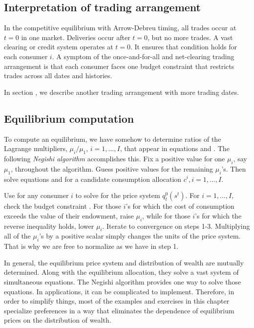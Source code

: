 \subsection{Interpretation of trading arrangement}
  In the  competitive   equilibrium with Arrow-Debreu timing, all trades occur at $t=0$ in
one market.  Deliveries occur after $t=0$, but no more trades.
  A vast clearing or credit system operates at $t=0$.
It ensures that condition  holds for each consumer
$i$.   A symptom of the once-and-for-all and net-clearing trading arrangement is
that each consumer faces one  budget constraint that restricts  trades across all dates and histories.


  In section , we describe another trading arrangement with
more trading dates. %


\subsection{Equilibrium computation}
To compute an equilibrium, we have somehow to determine ratios of
the Lagrange multipliers, $\mu_i / \mu_1$, $i=1, \ldots, I $,
that appear in equations  and .  The following {\it
Negishi algorithm\/} accomplishes this.
\medskip
{}  Fix a positive value for one $\mu_i$, say $\mu_1$,
throughout the algorithm.  Guess  positive values for the
remaining  $\mu_i$'s. Then solve  equations  and  for
a candidate consumption allocation $c^i, i=1, \ldots, I$.

\medskip
{}  Use  for any consumer $i$ to solve for the
price system $q_t^0(s^t)$.
\medskip
{}  For $i =1, \ldots, I$, check the budget constraint
.  For those $i$'s for which the cost of consumption
exceeds the value of their endowment, raise $\mu_i$, while for
those $i$'s for which the reverse inequality holds, lower $\mu_i$.
\medskip {} Iterate to convergence on steps 1-3.
\medskip
Multiplying all of the $\mu_i$'s by a positive scalar
simply  changes the units of the price system. That is why we
are free to normalize as we have in step 1.

In general, the equilibrium price system and distribution of wealth are mutually determined. Along with the equilibrium allocation, they solve
a vast system of simultaneous equations.  The Negishi algorithm provides one way to solve those equations.
In applications, it can be complicated to implement.  Therefore, in order to simplify things,
  most of the examples and exercises in this chapter specialize  preferences
in a way that eliminates the dependence of equilibrium prices on the distribution of wealth.







